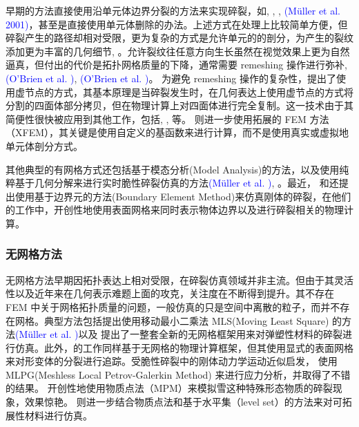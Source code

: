 早期的方法直接使用沿单元体边界分裂的方法来实现碎裂，如, , , \textcolor{blue}{(M\"{u}ller et al. 2001)\parencite{Muller2001}}，甚至是直接使用单元体删除的办法。上述方式在处理上比较简单方便，但碎裂产生的路径却相对受限，更为复杂的方式是允许单元的的剖分，为产生的裂纹添加更为丰富的几何细节, 。允许裂纹往任意方向生长虽然在视觉效果上更为自然逼真，但付出的代价是拓扑网格质量的下降，通常需要 remeshing 操作进行弥补, \textcolor{blue}{(O'Brien et al. )\parencite{OBrien1999}}, \textcolor{blue}{(O'Brien et al. )\parencite{OBrien2002}}。 为避免 remeshing 操作的复杂性，提出了使用虚节点的方式，其基本原理是当碎裂发生时，在几何表达上使用虚节点的方式将分割的四面体部分拷贝，但在物理计算上对四面体进行完全复制。这一技术由于其简便性很快被应用到其他工作，包括, , 等。 则进一步使用拓展的 FEM 方法（XFEM），其关键是使用自定义的基函数来进行计算，而不是使用真实或虚拟地单元体剖分方式。

其他典型的有网格方式还包括基于模态分析(Model Analysis)的方法，以及使用纯粹基于几何分解来进行实时脆性碎裂仿真的方法\textcolor{blue}{(M\"{u}ller et al. )\parencite{Muller2013}}, 。最近， 和还提出使用基于边界元的方法(Boundary Element Method)来仿真刚体的碎裂，在他们的工作中，开创性地使用表面网格来同时表示物体边界以及进行碎裂相关的物理计算。

\subsubsection{无网格方法}

无网格方法早期因拓扑表达上相对受限，在碎裂仿真领域并非主流。但由于其灵活性以及近年来在几何表示难题上面的攻克，关注度在不断得到提升。其不存在FEM 中关于网格拓扑质量的问题，一般仿真的只是空间中离散的粒子，而并不存在网格。典型方法包括提出使用移动最小二乘法 MLS(Moving Least Square) 的方法\textcolor{blue}{(M\"{u}ller et al. )\parencite{Muller2004}}以及 提出了一整套全新的无网格框架用来对弹塑性材料的碎裂进行仿真。此外，的工作同样基于无网格的物理计算框架，但其使用显式的表面网格来对形变体的分裂进行追踪。受脆性碎裂中的刚体动力学运动近似启发，
使用 MLPG(Meshless Local Petrov-Galerkin Method) 来进行应力分析，并取得了不错的结果。
开创性地使用物质点法（MPM）来模拟雪这种特殊形态物质的碎裂现象，效果惊艳。
则进一步结合物质点法和基于水平集（level set）的方法来对可拓展性材料进行仿真。

